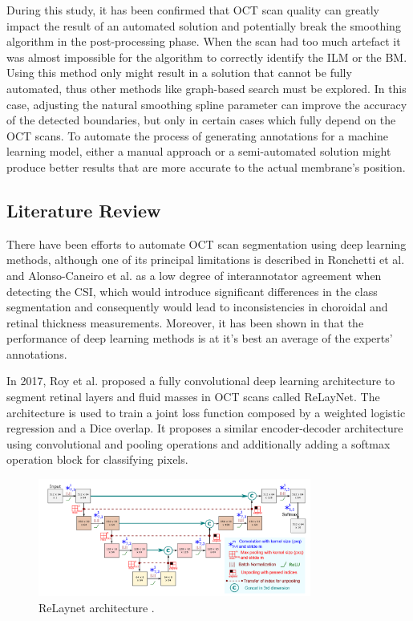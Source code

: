\documentclass[12pt,a4paper]{scrartcl}
\begin{document}
During this study, it has been confirmed that OCT scan quality can greatly impact the result of an automated solution and potentially break the smoothing algorithm in the post-processing phase. When the scan had too much artefact it was almost impossible for the algorithm to correctly identify the ILM or the BM. Using this method only might result in a solution that cannot be fully automated, thus other methods like graph-based search must be explored. In this case, adjusting the natural smoothing spline parameter can improve the accuracy of the detected boundaries, but only in certain cases which fully depend on the OCT scans. To automate the process of generating annotations for a machine learning model, either a manual approach or a semi-automated solution might produce better results that are more accurate to the actual membrane's position.  

\subsection{Literature Review}
There have been efforts to automate OCT scan segmentation using deep learning methods, although one of its principal limitations is described in Ronchetti et al. \cite{Ronchetti2019} and Alonso-Caneiro et al. \cite{Alonso-Caneiro2013} as a low degree of interannotator agreement when detecting the CSI, which would introduce significant differences in the class segmentation and consequently would lead to inconsistencies in choroidal and retinal thickness measurements. Moreover, it has been shown in \cite{Maloca2021} that the performance of deep learning methods is at it's best an average of the experts' annotations.

In 2017, Roy et al. \cite{Roy2017} proposed a fully convolutional deep learning architecture to segment retinal layers and fluid masses in OCT scans called ReLayNet. The architecture is used to train a joint loss function composed by  a weighted logistic regression and a Dice overlap. It proposes a similar encoder-decoder architecture using convolutional and pooling operations and additionally adding a softmax operation block for classifying pixels.

\begin{figure}[H]
    \centering
    \includegraphics[width=0.8\textwidth]{./images/relaynet-architecture.png}
    \caption{ReLaynet architecture \cite{Roy2017}.}
\end{figure}
\end{document}
